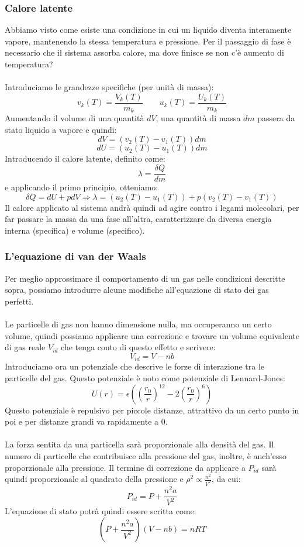 \documentclass{article}
\begin{document}
\subsubsection{Calore latente}
Abbiamo visto come esiste una condizione in cui un liquido diventa interamente vapore, mantenendo la stessa temperatura e pressione. Per il passaggio di fase è necessario che il sistema assorba calore, ma dove finisce se non c'è aumento di temperatura?\\\\
Introduciamo le grandezze specifiche (per unità di massa):
$$ v_k(T) = \frac{V_k(T)}{m_k} \qquad u_k(T) = \frac{U_k(T)}{m_k} $$
Aumentando il volume di una quantità $dV$, una quantità di massa $dm$ passera da stato liquido a vapore e quindi:
$$ dV=\left( v_2(T)-v_1(T) \right) dm $$
$$ dU = \left( u_2(T) - u_1(T) \right)dm $$
Introducendo il calore latente, definito come:
$$ \lambda = \frac{\delta Q}{dm} $$
e applicando il primo principio, otteniamo:
$$ \delta Q = dU+pdV \Rightarrow \lambda = \left( u_2(T)-u_1(T) \right) + p\left( v_2(T)-v_1(T) \right) $$
Il calore applicato al sistema andrà quindi ad agire contro i legami molecolari, per far passare la massa da una fase all'altra, caratterizzare da diversa energia interna (specifica) e volume (specifico).

\subsubsection{L'equazione di van der Waals}
Per meglio approssimare il comportamento di un gas nelle condizioni descritte sopra, possiamo introdurre alcune modifiche all'equazione di stato dei gas perfetti.\\\\
Le particelle di gas non hanno dimensione nulla, ma occuperanno un certo volume, quindi possiamo applicare una correzione e trovare un volume equivalente di gas reale $V_{id}$ che tenga conto di questo effetto e scrivere:
$$ V_{id} = V-nb $$
Introduciamo ora un potenziale che descrive le forze di interazione tra le particelle del gas. Questo potenziale è noto come potenziale di Lennard-Jones:
$$ U(r) = \epsilon\left( \left( \frac{r_0}{r} \right)^{12} -2 \left( \frac{r_0}{r} \right)^6 \right) $$
Questo potenziale è repulsivo per piccole distanze, attrattivo da un certo punto in poi e per distanze grandi va rapidamente a 0.\\\\
La forza sentita da una particella sarà proporzionale alla densità del gas. Il numero di particelle che contribuisce alla pressione del gas, inoltre, è anch'esso proporzionale alla pressione. Il termine di correzione da applicare a $P_{id}$ sarà quindi proporzionale al quadrato della pressione e $\rho^2\propto\frac{n^2}{V^2}$, da cui:
$$ P_{id} = P+\frac{n^2a}{V^2} $$
L'equazione di stato potrà quindi essere scritta come:
$$ \left( P+\frac{n^2a}{V^2} \right)\left( V-nb \right) = nRT$$
\end{document}
